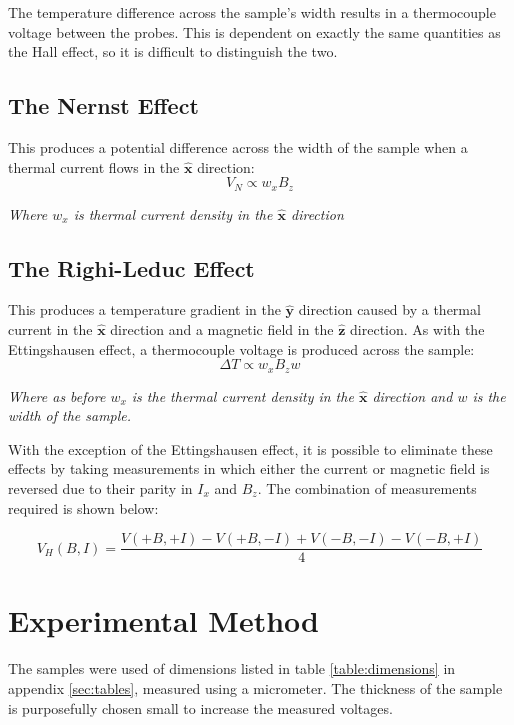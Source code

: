 \documentclass[a4paper]{article}
\newcommand{\supercite}[1]{\textsuperscript{\cite{#1}}}
\begin{document}
			\noindent The temperature difference across the sample's width results in a thermocouple voltage between the probes. This is dependent on exactly the same quantities as the Hall effect, so it is difficult to distinguish the two.
		
		\subsection{The Nernst Effect}
			This produces a potential difference across the width of the sample when a thermal current flows in the $\hat{\mathbf{x}}$ direction\supercite{lindbergHall}:
			\begin{equation}
				V_N \propto w_xB_z
			\end{equation}	
			\begin{center} \emph{Where $w_x$ is thermal current density in the $\hat{\mathbf{x}}$ direction} \end{center}
		
		\subsection{The Righi-Leduc Effect}
			This produces a temperature gradient in the $\hat{\mathbf{y}}$ direction caused by a thermal current in the $\hat{\mathbf{x}}$ direction and a magnetic field in the $\hat{\mathbf{z}}$ direction\supercite{lindbergHall}. As with the Ettingshausen effect, a thermocouple voltage is produced across the sample:
			\begin{equation}
				\Delta T \propto w_xB_zw
			\end{equation}
			\begin{center} \emph{Where as before $w_x$ is the thermal current density in the $\hat{\mathbf{x}}$ direction and $w$ is the width of the sample.} \end{center}
		
		With the exception of the Ettingshausen effect, it is possible to eliminate these effects by taking measurements in which either the current or magnetic field is reversed due to their parity in $I_x$ and $B_z$. The combination of measurements required is shown below\supercite{lindbergHall}:
		
		\begin{equation} \label{eq:removeErrors}
			V_H(B,I) = \frac{V(+B,+I)-V(+B,-I)+V(-B,-I)-V(-B,+I)}{4}
		\end{equation}
		
	\section{Experimental Method}
		The samples were used of dimensions listed in table \ref{table:dimensions} in appendix \ref{sec:tables}, measured using a micrometer. The thickness of the sample is purposefully chosen small to increase the measured voltages.
		
\end{document}
